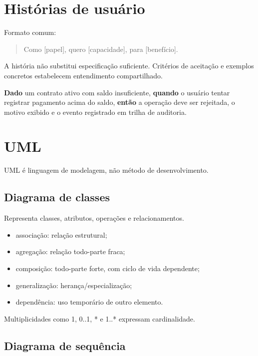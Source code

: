 \section{Histórias de usuário}

Formato comum:
\begin{quote}
Como [papel], quero [capacidade], para [benefício].
\end{quote}

A história não substitui especificação suficiente. Critérios de aceitação e exemplos concretos estabelecem entendimento compartilhado.

\begin{exemplo}
\textbf{Dado} um contrato ativo com saldo insuficiente, \textbf{quando} o usuário tentar registrar pagamento acima do saldo, \textbf{então} a operação deve ser rejeitada, o motivo exibido e o evento registrado em trilha de auditoria.
\end{exemplo}

\section{UML}

UML é linguagem de modelagem, não método de desenvolvimento.

\subsection{Diagrama de classes}

Representa classes, atributos, operações e relacionamentos.

\begin{itemize}
\item associação: relação estrutural;
\item agregação: relação todo-parte fraca;
\item composição: todo-parte forte, com ciclo de vida dependente;
\item generalização: herança/especialização;
\item dependência: uso temporário de outro elemento.
\end{itemize}

Multiplicidades como 1, 0..1, * e 1..* expressam cardinalidade.

\subsection{Diagrama de sequência}

